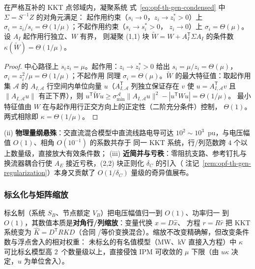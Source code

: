 \begin{proposition}\label{prop:opf-th-gen-mu-cond}
在严格互补的 KKT 点邻域内，凝聚系统
式~\eqref{eq:opf-th-gen-condensed} 中 $\Sigma=S^{-1}Z$ 的对角元满足：
起作用约束（$s_i\to0$，$z_i\to z_i^*>0$）上
$\sigma_i=z_i/s_i=\Theta(1/\mu)$；不起作用约束（$s_i\to s_i^*>0$，
$z_i\to0$）上 $\sigma_i=\Theta(\mu)$。设 $A_I$ 起作用行独立、$W$ 有界，
则凝聚 (1,1) 块 $\widetilde W=W+A_I^{\mathsf T}\Sigma A_I$ 的条件数
$\kappa(\widetilde W)=\Theta(1/\mu)$。
\end{proposition}

\begin{proof}
中心路径上 $s_iz_i=\mu$。起作用：$z_i\to z_i^*>0$ 给出
$s_i=\mu/z_i=\Theta(\mu)$，$\sigma_i=z_i^2/\mu=\Theta(1/\mu)$；不起作用
同理 $\sigma_i=\Theta(\mu)$。$\widetilde W$ 的最大特征值：取起作用集
$\mathcal A$ 的 $A_{I,\mathcal A}$ 行空间内单位向量 $u$（$A_{I,\mathcal A}
^{\mathsf T}$ 列独立保证存在 $v$ 使 $u=A_{I,\mathcal A}^{\mathsf T}v$ 且
$\lVert A_{I,\mathcal A}u\rVert$ 有正下界），则
$u^{\mathsf T}\widetilde Wu\ge\sigma_{\min}^{\mathcal A}
\lVert A_{I,\mathcal A}u\rVert^2-|u^{\mathsf T}Wu|=\Theta(1/\mu)$。
最小特征值由 $W$ 在与起作用行正交方向上的正定性（二阶充分条件）控制，
$\Theta(1)$。两式相除即 $\kappa=\Theta(1/\mu)$。
\end{proof}

\begin{remark}[其余两个来源]\label{rem:opf-th-gen-cond-sources}
(ii) \textbf{物理量纲悬殊}：交直流混合模型中直流线路电导可达
$10^2\sim10^3$~pu，与电压幅值 $O(1)$、相角 $O(10^{-1})$ 的系数共存于
同一 KKT 系统，行/列范数跨 $4$ 个以上数量级，直接放大有效条件数；
(iii) \textbf{近简并与亏秩}：零阻抗支路、参考钉扎与换流器耦合行使
$A_E$ 接近亏秩，(2,2) 块正则化 $\delta_C$ 的引入（
注记~\ref{rem:opf-th-gen-regularization}）本身又贡献了
$O(1/\delta_C)$ 量级的奇异值展布。
\end{remark}

\subsubsection{标幺化与矩阵缩放}

\begin{remark}[标幺化的条件数意义]\label{rem:opf-th-gen-perunit}
标幺制（系统 $S_B$、节点额定 $V_B$）把电压幅值归一到 $O(1)$、功率归一
到 $O(1)$，其数值本质是\textbf{对角行/列缩放}：变量代换 $x=D\hat x$、
方程 $r=R\hat r$ 把 KKT 系统变为 $\widehat K=D^{\mathsf T}RK D$（合同
/等价变换混合）。缩放不改变精确解，但改变条件数与浮点舍入的相对权重：
未标幺的有名值模型（MW、kV 直接入方程）中
$\kappa$ 可比标幺模型高 $2$~个数量级以上，直接侵蚀 IPM 可收敛的
$\mu$ 下限（由 $u\kappa$ 决定，$u$ 为单位舍入）。
\end{remark}

